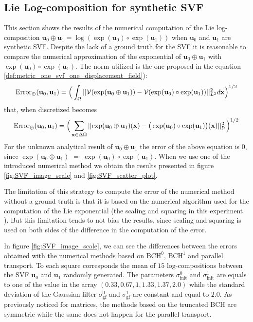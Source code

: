 \subsection{Lie Log-composition for synthetic SVF}
This section shows the results of the numerical computation of the Lie log-composition $\mathbf{u}_0\oplus\mathbf{u}_1 = \log(\exp(\mathbf{u}_0)\circ \exp(\mathbf{u}_1))$ when $\mathbf{u}_0$ and $\mathbf{u}_1$ are synthetic SVF. Despite the lack of a ground truth for the SVF it is reasonable to compare the numerical approximation of the exponential of $\mathbf{u}_0\oplus\mathbf{u}_1$ with $\exp(\mathbf{u}_0)\circ \exp(\mathbf{u}_1)$. The norm utilized is the one proposed in the equation \ref{def:metric_one_svf_one_displacement_field}):
\begin{align}
\text{Error}_{\oplus}(\mathbf{u}_0, \mathbf{u}_1)
= 
\Big(\int_{\Omega} \vert\lvert \mathcal{V}(\exp(\mathbf{u}_0\oplus\mathbf{u}_1)) - \mathcal{V}(\exp(\mathbf{u}_0)\circ \exp(\mathbf{u}_1)) \rvert\vert_{L^2}^{2} d\mathbf{x} \Big)^{1/2}
\end{align} 
that, when discretized becomes
\begin{align}\label{eq:error_svf_sythetic_data}
\text{Error}_{\oplus}(\mathbf{u}_0, \mathbf{u}_1) 
= 
\Big( \sum_{\mathbf{x} \in \Delta\Omega} 
\vert\lvert \exp(\mathbf{u}_0\oplus\mathbf{u}_1)(\mathbf{x}) 
	-
\big(\exp(\mathbf{u}_0)\circ \exp(\mathbf{u}_1)\big)(\mathbf{x}) 
	   \rvert\vert_{l^2}^{2}  \Big)^{1/2}
\end{align} 
For the unknown analytical result of $\mathbf{u}_0\oplus\mathbf{u}_1$ the error of the above equation is $0$, since $\exp(\mathbf{u}_0\oplus\mathbf{u}_1)$ $=$
$\exp(\mathbf{u}_0)\circ \exp(\mathbf{u}_1)$. When we use one of the introduced numerical method we obtain the results presented in figure \ref{fig:SVF_image_scale} and \ref{fig:SVF_scatter_plot}. 

The limitation of this strategy to compute the error of the numerical method without a ground truth is that it is based on the numerical algorithm used for the computation of the Lie exponential (the scaling and squaring in this experiment \cite{arsigny2006log}). But this limitation tends to not bias the results, since scaling and squaring is used on both sides of the difference in the computation of the error.

In figure \ref{fig:SVF_image_scale}, we can see the differences between the errors obtained with the numerical methods based on $\text{BCH}^0$, $\text{BCH}^1$ and parallel transport. To each square corresponds the mean of $15$ log-compositions between the SVF $\mathbf{u}_0$ and $\mathbf{u}_1$ randomly generated. The parameters $\sigma_{\text{init}}^{0}$ and $\sigma_{\text{init}}^{1}$ are equals to one of the value in the array $(0.33, 0.67, 1, 1.33, 1.37, 2.0)$ while the standard deviation of the Gaussian filter $\sigma_{\text{gf}}^{0}$ and $\sigma_{\text{gf}}^{1}$ are constant and equal to $2.0$. As previously noticed for matrices, the methods based on the truncated  BCH are symmetric while the same does not happen for the parallel transport. 


